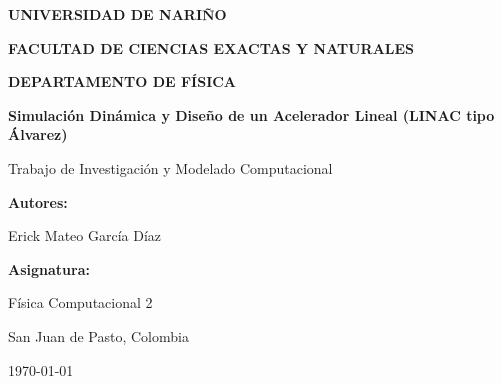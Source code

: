 \documentclass[12pt,a4paper]{report}
\begin{document}
\begin{titlepage}
    \centering
    \vspace*{0.5cm}
    {\bfseries\Large UNIVERSIDAD DE NARIÑO \par}
    \vspace{0.3cm}
    {\bfseries\large FACULTAD DE CIENCIAS EXACTAS Y NATURALES \par}
    \vspace{0.2cm}
    {\bfseries\large DEPARTAMENTO DE FÍSICA \par}
    \vspace{1.8cm}
    
    {\huge\bfseries Simulación Dinámica y Diseño de un Acelerador Lineal (LINAC tipo Álvarez) \par}
    \vspace{0.5cm}
    {\large Trabajo de Investigación y Modelado Computacional \par}
    \vspace{2.0cm}
    
    {\large\textbf{Autores:}\par}
    {\large Erick Mateo García Díaz \par}
    \vspace{1.2cm}
    
    {\large\textbf{Asignatura:}\par}
    {Física Computacional 2 \par}
    \vspace{2.0cm}
    
    {\large San Juan de Pasto, Colombia \par}
    {\large \today \par}
\end{titlepage}






\newpage
\tableofcontents
\newpage
\listoffigures
\newpage
\listoftables
\newpage












\nocite{*} %


\end{document}
